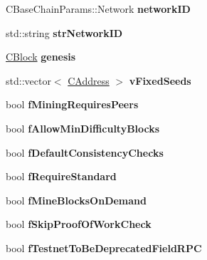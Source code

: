 \begin{DoxyCompactItemize}
\item 
\mbox{\label{class_c_chain_params_a607373a144da14ba379464b370ceb2b8}} 
C\+Base\+Chain\+Params\+::\+Network {\bfseries network\+ID}
\item 
\mbox{\label{class_c_chain_params_a8542ce21d5b9bdc2eadad8702fdd584a}} 
std\+::string {\bfseries str\+Network\+ID}
\item 
\mbox{\label{class_c_chain_params_a2e4119fa75f6ea0c64ba8809dab5c4f8}} 
\mbox{\hyperlink{class_c_block}{C\+Block}} {\bfseries genesis}
\item 
\mbox{\label{class_c_chain_params_af3ad79fb5bf4938750317c91e4c4b954}} 
std\+::vector$<$ \mbox{\hyperlink{class_c_address}{C\+Address}} $>$ {\bfseries v\+Fixed\+Seeds}
\item 
\mbox{\label{class_c_chain_params_abe9980263561e3f26b6352daa64092da}} 
bool {\bfseries f\+Mining\+Requires\+Peers}
\item 
\mbox{\label{class_c_chain_params_a74e3e9749210d78d6d3e021254bb8ac4}} 
bool {\bfseries f\+Allow\+Min\+Difficulty\+Blocks}
\item 
\mbox{\label{class_c_chain_params_a630f023ae4a95a8b420bad0a08b4428c}} 
bool {\bfseries f\+Default\+Consistency\+Checks}
\item 
\mbox{\label{class_c_chain_params_abc615d2750d847e1eac0ecb7fc8d2da8}} 
bool {\bfseries f\+Require\+Standard}
\item 
\mbox{\label{class_c_chain_params_ad640045ea40c569df7b826551872e1bd}} 
bool {\bfseries f\+Mine\+Blocks\+On\+Demand}
\item 
\mbox{\label{class_c_chain_params_a69af48fdfc37e1b6bc9ebf99cbd3d381}} 
bool {\bfseries f\+Skip\+Proof\+Of\+Work\+Check}
\item 
\mbox{\label{class_c_chain_params_a4f62f1b7070f83b48aa86564628a2e7d}} 
bool {\bfseries f\+Testnet\+To\+Be\+Deprecated\+Field\+R\+PC}

\end{DoxyCompactItemize}
